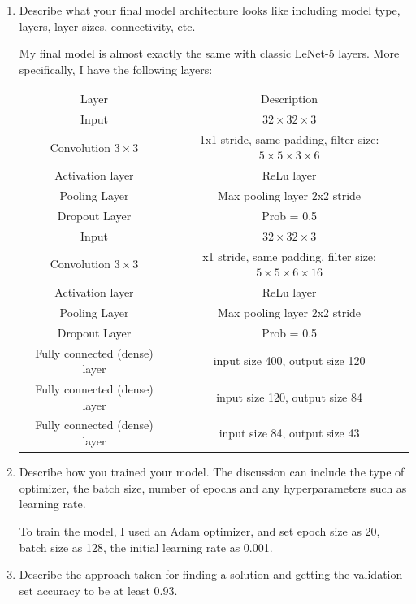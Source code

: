 \documentclass[paper=a4, fontsize=11pt]{scrartcl}
\numberwithin{equation}{section}		%
\numberwithin{figure}{section}			%
\numberwithin{table}{section}				%
\begin{document}
\begin{enumerate}
\item Describe what your final model architecture looks like including model type, layers, layer sizes, connectivity, etc.

My final model is almost exactly the same with classic LeNet-5 layers. More specifically, I have the following layers:


\begin{center}
\begin{tabular}{ c c }
 Layer & Description\\ 
 Input & $32 \times 32 \times 3$\\  
 Convolution $3 \times 3$& 1x1 stride, same padding, filter size: $5 \times 5 \times 3 \times 6$\\
 Activation layer & ReLu layer \\
 Pooling Layer & Max pooling layer 2x2 stride \\
 Dropout Layer & Prob = 0.5 \\
 
  Input & $32 \times 32 \times 3$\\  
 Convolution $3 \times 3$& x1 stride, same padding, filter size: $5 \times 5 \times 6 \times 16$\\
 Activation layer & ReLu layer \\
 Pooling Layer & Max pooling layer 2x2 stride \\
 Dropout Layer & Prob = 0.5 \\
 
Fully connected (dense) layer & input size 400, output size 120\\
Fully connected (dense) layer & input size 120, output size 84\\
Fully connected (dense) layer & input size 84, output size 43\\
 
\end{tabular}
\end{center}

\item Describe how you trained your model. The discussion can include the type of optimizer, the batch size, number of epochs and any hyperparameters such as learning rate.

To train the model, I used an Adam optimizer, and set epoch size as 20, batch size as 128, the initial learning rate as 0.001.

\item Describe the approach taken for finding a solution and getting the validation set accuracy to be at least 0.93. 


\end{enumerate}
\end{document}
